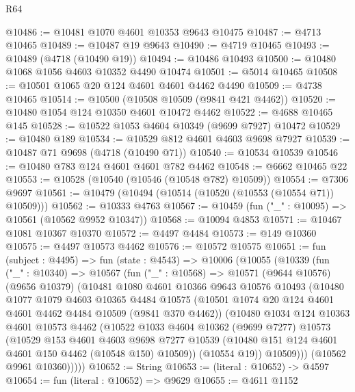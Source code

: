 \begin{lexlean}{R64}
\begin{coremodule}
@10486 := @10481 @1070 @4601 @10353 @9643 @10475
@10487 := @4713 @10465
@10489 := @10487 @19 @9643
@10490 := @4719 @10465
@10493 := @10489 (@4718 (@10490 @19))
@10494 := @10486 @10493
@10500 := @10480 @1068 @1056 @4603 @10352 @4490 @10474
@10501 := @5014 @10465
@10508 := @10501 @1065 @20 @124 @4601 @4601 @4462 @4490
@10509 := @4738 @10465
@10514 := @10500 (@10508 @10509 (@9841 @421 @4462))
@10520 := @10480 @1054 @124 @10350 @4601 @10472 @4462
@10522 := @4688 @10465 @145
@10528 := @10522 @1053 @4604 @10349 (@9699 @7927) @10472
@10529 := @10480 @189
@10534 := @10529 @812 @4601 @4603 @9698 @7927
@10539 := @10487 @71 @9698 (@4718 (@10490 @71))
@10540 := @10534 @10539
@10546 := @10480 @783 @124 @4601 @4601 @782 @4462
@10548 := @6662 @10465 @22
@10553 := @10528 (@10540 (@10546 (@10548 @782) @10509))
@10554 := @7306 @9697
@10561 := @10479 (@10494 (@10514 (@10520 (@10553 (@10554 @71)) @10509)))
@10562 := @10333 @4763
@10567 := @10459 (fun ("_" : @10095) => @10561 (@10562 @9952 @10347))
@10568 := @10094 @4853
@10571 := @10467 @1081 @10367 @10370
@10572 := @4497 @4484
@10573 := @149 @10360
@10575 := @4497 @10573 @4462
@10576 := @10572 @10575
@10651 := fun (subject : @4495) =>
  fun (state : @4543) =>
  @10006
    (@10055
      (@10339
        (fun ("_" : @10340) =>
        @10567
          (fun ("_" : @10568) =>
          @10571
            (@9644 @10576)
            (@9656 @10379)
            (@10481
              @1080
              @4601
              @10366
              @9643
              @10576
              @10493
              (@10480
                @1077
                @1079
                @4603
                @10365
                @4484
                @10575
                (@10501 @1074 @20 @124 @4601 @4601 @4462 @4484 @10509 (@9841 @370 @4462))
                (@10480
                  @1034
                  @124
                  @10363
                  @4601
                  @10573
                  @4462
                  (@10522
                    @1033
                    @4604
                    @10362
                    (@9699 @7277)
                    @10573
                    (@10529
                      @153
                      @4601
                      @4603
                      @9698
                      @7277
                      @10539
                      (@10480 @151 @124 @4601 @4601 @150 @4462 (@10548 @150) @10509))
                    (@10554 @19))
                  @10509)))
            (@10562 @9961 @10360)))))
@10652 := String
@10653 := (literal : @10652) -> @4597
@10654 := fun (literal : @10652) => @9629
@10655 := @4611 @1152

\end{coremodule}
\end{lexlean}
